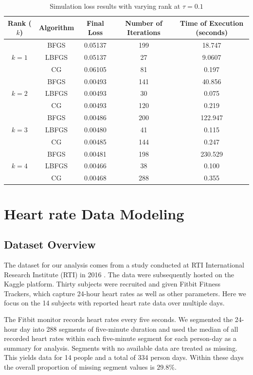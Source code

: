 \documentclass{article}
\begin{document}
\begin{table}[ht]
    \centering
    \begin{tabular}{|c|c|c|c|c|}
    \hline
    Rank ($k$) & Algorithm & Final Loss & Number of Iterations & Time of Execution (seconds) \\
    \hline
    \multirow{3}{*}{$k = 1$} & BFGS & 0.05137 & 199 & 18.747 \\
    & LBFGS & 0.05137 & 27 & 9.0607 \\
    & CG & 0.06105 & 81 & 0.197 \\
    \hline
    \multirow{3}{*}{$k = 2$} & BFGS & 0.00493 & 141 & 40.856 \\
    & LBFGS & 0.00493 & 30 & 0.075 \\
    & CG & 0.00493 & 120 & 0.219 \\
    \hline
    \multirow{3}{*}{$k = 3$} & BFGS & 0.00486 & 200 & 122.947 \\
    & LBFGS & 0.00480 & 41 & 0.115 \\
    & CG & 0.00485 & 144 & 0.247 \\
    \hline
    
    \multirow{3}{*}{$k = 4$} & BFGS & 0.00481 & 198 & 230.529 \\
    & LBFGS & 0.00466 & 38 & 0.100 \\
    & CG & 0.00468 & 288 & 0.355 \\
    \hline
    \end{tabular}
    \caption{Simulation loss results with varying rank at $\tau = 0.1$}
    \label{tab:varying_k}
\end{table}


\section{Heart rate Data Modeling}

\subsection{Dataset Overview}
The dataset for our analysis comes from a study conducted at RTI International Research Institute (RTI) in 2016 \cite{furberg_2016_53894}.  The data were subsequently hosted on the Kaggle platform.   Thirty subjects were recruited and given Fitbit Fitness Trackers, which capture 24-hour heart rates as well as other parameters.  Here we focus on the 14 subjects with reported heart rate data over multiple days.

The Fitbit monitor records heart rates every five seconds.  We segmented the 24-hour day into 288 segments of five-minute duration and used the median of all recorded heart rates within each five-minute segment for each person-day as a summary for analysis.  Segments with no available data are treated as missing.  This yields data for 14 people and a total of 334 person days.  Within these days the overall proportion of missing segment values is $29.8\%$.
\end{document}
